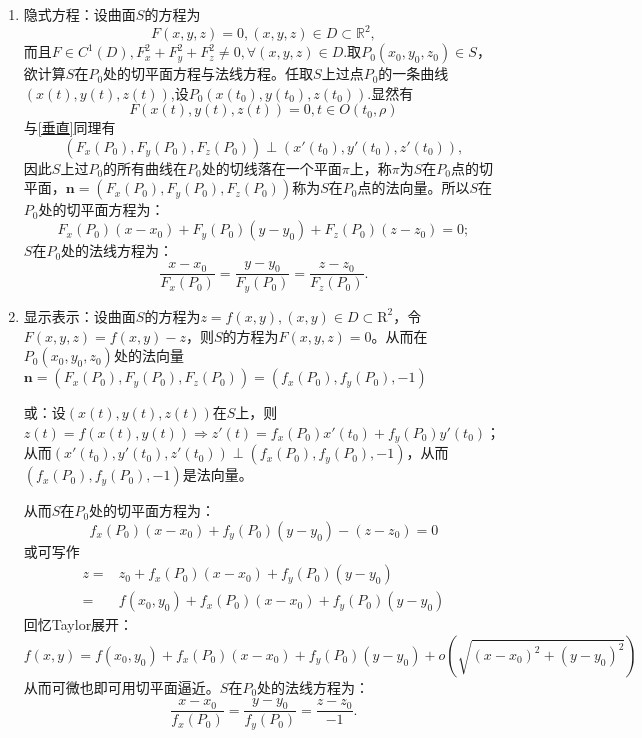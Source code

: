 \documentclass[UTF8]{ctexart}
\begin{document}
    \begin{enumerate}[(1)]
        \item 隐式方程：设曲面$S$的方程为
        $$F(x,y,z)=0,(x,y,z)\in D\subset\mathbb{R}^2,$$
        而且$F\in C^1(D),F_x^2+F_y^2+F_z^2\not=0,\forall(x,y,z)\in D$.取$P_0(x_0,y_0,z_0)\in S$，欲计算$S$在$P_0$处的切平面方程与法线方程。任取$S$上过点$P_0$的一条曲线$(x(t),y(t),z(t))$,设$P_0(x(t_0),y(t_0),z(t_0))$.显然有
        $$F(x(t),y(t),z(t))=0,t\in O(t_0,\rho)$$与\ref{垂直}同理有
        $$(F_x(P_0),F_y(P_0),F_z(P_0))\perp(x'(t_0),y'(t_0),z'(t_0)),$$
        因此$S$上过$P_0$的所有曲线在$P_0$处的切线落在一个平面$\pi$上，称$\pi$为$S$在$P_0$点的切平面，$\boldsymbol{n}=(F_x(P_0),F_y(P_0),F_z(P_0))$称为$S$在$P_0$点的法向量。所以$S$在$P_0$处的切平面方程为：
        \begin{equation}
            F_x(P_0)(x-x_0)+F_y(P_0)(y-y_0)+F_z(P_0)(z-z_0)=0;
        \end{equation}
        $S$在$P_0$处的法线方程为：
        \begin{equation}
            \frac{x-x_0}{F_x(P_0)}=\frac{y-y_0}{F_y(P_0)}=\frac{z-z_0}{F_z(P_0)}.
        \end{equation}

        \item 显示表示：设曲面$S$的方程为$z=f(x,y),(x,y)\in D\subset\mathrm{R}^2$，令$F(x,y,z)=f(x,y)-z$，则$S$的方程为$F(x,y,z)=0$。从而在$P_0(x_0,y_0,z_0)$处的法向量$\boldsymbol{n}=(F_x(P_0),F_y(P_0),F_z(P_0))=(f_x(P_0),f_y(P_0),-1)$
        
        或：设$(x(t),y(t),z(t))$在$S$上，则$z(t)=f(x(t),y(t))\Rightarrow z'(t)=f_x(P_0)x'(t_0)+f_y(P_0)y'(t_0)$；从而$(x'(t_0),y'(t_0),z'(t_0))\perp(f_x(P_0),f_y(P_0),-1)$，从而$(f_x(P_0),f_y(P_0),-1)$是法向量。

        从而$S$在$P_0$处的切平面方程为：
        \begin{equation}
            f_x(P_0)(x-x_0)+f_y(P_0)(y-y_0)-(z-z_0)=0
        \end{equation}
        或可写作
        \begin{align*}
            z=&z_0+f_x(P_0)(x-x_0)+f_y(P_0)(y-y_0)\\
            =&f(x_0,y_0)+f_x(P_0)(x-x_0)+f_y(P_0)(y-y_0)
        \end{align*}
        回忆Taylor展开：
        \begin{equation}
            f(x,y)=f(x_0,y_0)+f_x(P_0)(x-x_0)+f_y(P_0)(y-y_0)+o(\sqrt{(x-x_0)^2+(y-y_0)^2})
        \end{equation}
        从而可微也即可用切平面逼近。$S$在$P_0$处的法线方程为：
        \begin{equation}
            \frac{x-x_0}{f_x(P_0)}=\frac{y-y_0}{f_y(P_0)}=\frac{z-z_0}{-1}.
        \end{equation}


\end{enumerate}
\end{document}
